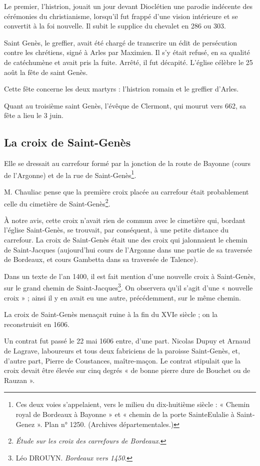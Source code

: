 Le premier, l'histrion, jouait un jour devant Dioclétien une parodie indécente des cérémonies du christianisme, lorsqu'il fut frappé d'une vision intérieure et se convertit à la foi nouvelle. Il subit le supplice du chevalet en 286 ou 303.

Saint Genès, le greffier, avait été chargé de transcrire un édit de persécution contre les chrétiens, signé à Arles par Maximien. Il s'y était refusé, en sa qualité de catéchumène et avait pris la fuite. Arrêté, il fut décapité. L'église célèbre le 25 août la fête de saint Genès.

Cette fête concerne les deux martyrs : l'histrion romain et le greffier d'Arles.

Quant au troisième saint Genès, l'évêque de Clermont, qui mourut vers 662, sa fête a lieu le 3 juin.

\subsection{La croix de Saint-Genès}

Elle se dressait au carrefour formé par la jonction de la route de Bayonne (cours de l'Argonne) et de la rue de Saint-Genès\footnote{Ces deux voies s'appelaient, vers le milieu du dix-huitième siècle : « Chemin royal de Bordeaux à Bayonne » et « chemin de la porte SainteEulalie à Saint-Genez ». Plan n° 1250. (Archives départementales.)}.

M. Chauliac pense que la première croix placée au carrefour était probablement celle du cimetière de Saint-Genès\footnote{\textit{Étude sur les croix des carrefours de Bordeaux}.}.

À notre avis, cette croix n'avait rien de commun avec le cimetière qui, bordant l'église Saint-Genès, se trouvait, par conséquent, à une petite distance du carrefour. La croix de Saint-Genès était une des croix qui jalonnaient le chemin de Saint-Jacques (aujourd'hui cours de l'Argonne dans une partie de sa traversée de Bordeaux, et cours Gambetta dans sa traversée de Talence).

Dans un texte de l'an 1400, il est fait mention d'une nouvelle croix à Saint-Genès, sur le grand chemin de Saint-Jacques\footnote{Léo DROUYN. \textit{Bordeaux vers 1450}.}. On observera qu'il s'agit d'une « nouvelle croix » ; ainsi il y en avait eu une autre, précédemment, sur le même chemin.

La croix de Saint-Genès menaçait ruine à la fin du XVIe siècle ; on la reconstruisit en 1606.

Un contrat fut passé le 22 mai 1606 entre, d'une part. Nicolas Dupuy et Arnaud de Lagrave, laboureurs et tous deux fabriciens de la paroisse Saint-Genès, et, d'autre part, Pierre de Coustances, maître-maçon. Le contrat stipulait que la croix devait être élevée sur cinq degrés « de bonne pierre dure de Bouchet ou de Rauzan ».

